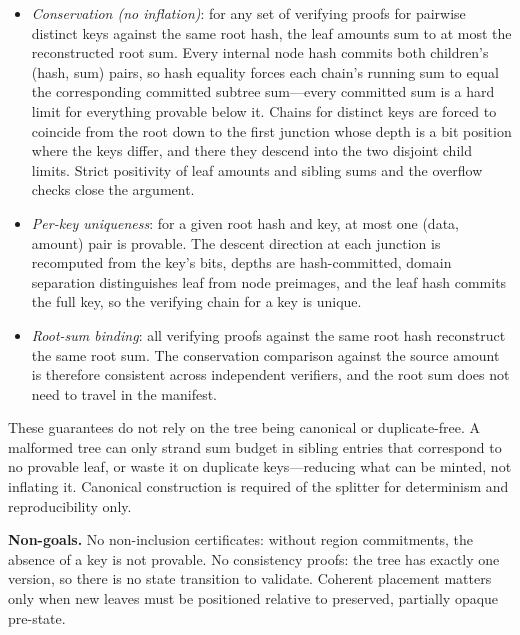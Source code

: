 \begin{itemize}
	\item \emph{Conservation (no inflation)}: for any set of verifying proofs for pairwise distinct keys against the same root hash, the leaf amounts sum to at most the reconstructed root sum. Every internal node hash commits both children's (hash, sum) pairs, so hash equality forces each chain's running sum to equal the corresponding committed subtree sum---every committed sum is a hard limit for everything provable below it. Chains for distinct keys are forced to coincide from the root down to the first junction whose depth is a bit position where the keys differ, and there they descend into the two disjoint child limits. Strict positivity of leaf amounts and sibling sums and the overflow checks close the argument.
	\item \emph{Per-key uniqueness}: for a given root hash and key, at most one (data, amount) pair is provable. The descent direction at each junction is recomputed from the key's bits, depths are hash-committed, domain separation distinguishes leaf from node preimages, and the leaf hash commits the full key, so the verifying chain for a key is unique.
	\item \emph{Root-sum binding}: all verifying proofs against the same root hash reconstruct the same root sum. The conservation comparison against the source amount is therefore consistent across independent verifiers, and the root sum does not need to travel in the manifest.
\end{itemize}

These guarantees do not rely on the tree being canonical or duplicate-free. A malformed tree can only strand sum budget in sibling entries that correspond to no provable leaf, or waste it on duplicate keys---reducing what can be minted, not inflating it. Canonical construction is required of the splitter for determinism and reproducibility only.

\textbf{Non-goals.} No non-inclusion certificates: without region commitments, the absence of a key is not provable. No consistency proofs: the tree has exactly one version, so there is no state transition to validate. Coherent placement matters only when new leaves must be positioned relative to preserved, partially opaque pre-state.
